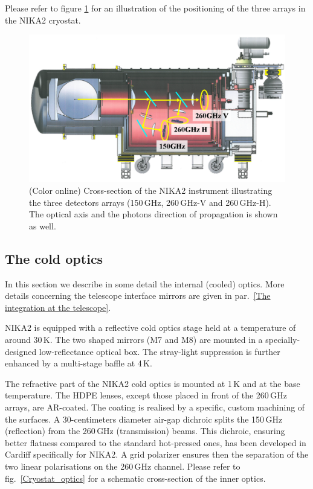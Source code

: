 \documentclass[]{aa} %
\begin{document}
Please refer to figure \ref{Cryostat} for an illustration of the positioning of the three arrays in the NIKA2 cryostat.
 
\begin{figure}[h]
   \centering
   \includegraphics[width=.95\linewidth]{Fig1_cryo.png}
      \caption{(Color online) Cross-section of the NIKA2 instrument illustrating the three detectors arrays (150\,GHz, 260\,GHz-V and 260\,GHz-H). The optical axis and the photons direction of propagation is shown as well.}
         \label{Cryostat}
\end{figure}


 \subsection{The cold optics}

In this section we describe in some detail the internal (cooled) optics. More
details concerning the telescope interface mirrors are given in par.~\ref{The
  integration at the telescope}.

NIKA2 is equipped with a reflective cold optics stage held at a temperature of
around 30\,K. The two shaped mirrors (M7 and M8) are mounted in a
specially-designed low-reflectance optical box. The stray-light suppression is
further enhanced by a multi-stage baffle at 4\,K.

The refractive part of the NIKA2 cold optics is mounted at 1\,K and at the base
temperature. The HDPE lenses, except those placed in front of the 260\,GHz
arrays, are AR-coated. The coating is realised by a specific, custom machining
of the surfaces. A 30-centimeters diameter air-gap dichroic splits the 150\,GHz
(reflection) from the 260\,GHz (transmission) beams. This dichroic, ensuring
better flatness compared to the standard hot-pressed ones, has been developed in
Cardiff specifically for NIKA2. A grid polarizer ensures then the separation of
the two linear polarisations on the 260\,GHz channel. Please refer to
fig.~\ref{Cryostat_optics} for a schematic cross-section of the inner optics.
\end{document}
